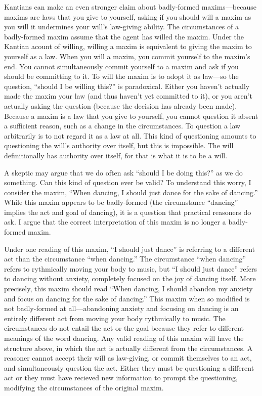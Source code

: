 \begin{isabellebody}
\begin{isamarkuptext}
Kantians can make an even stronger claim about badly-formed maxims—because maxims are laws that you 
give to yourself, asking if you should will a maxim as you will it undermines your will's law-giving 
ability. The circumstances of a badly-formed maxim assume that the agent has willed the maxim. Under 
the Kantian acount of willing, willing a maxim is equivalent to giving the maxim to yourself as a law. 
When you will a maxim, you commit yourself to the maxim's end. You cannot simultaneously 
commit yourself to a maxim and ask if you should be committing to it. To will the maxim is to adopt it as 
law—so the question, ``should I be willing this?'' is paradoxical. Either you haven't actually made 
the maxim your law (and thus haven't yet committed to it), or you aren't actually asking 
the question (because the decision has already been made). Because a maxim is a law that you give to 
yourself, you cannot question it absent a sufficient reason, such as a change in the circumstances. 
To question a law arbitrarily is to not regard it as a law at all. This kind of questioning amounts to 
questioning the will's authority over itself, but this is impossible. The will definitionally has authority 
over itself, for that is what it is to be a will. 

A skeptic may argue that we do often ask ``should I be doing this?'' as we do something. 
Can this kind of question ever be valid? To understand this worry, I consider the maxim, 
``When dancing, I should just dance for the sake of dancing.'' While this maxim appears to be badly-formed (the 
circumstance ``dancing'' implies the act and goal of dancing), it is a question that practical reasoners 
do ask. I argue that the correct interpretation of this maxim is no longer a badly-formed maxim.

Under one reading of this maxim, ``I should just dance'' is referring to a different act than the 
circumstance ``when dancing.'' The circumstance ``when dancing'' refers 
to rythmically moving your body to music, but ``I should just dance'' refers to dancing without anxiety, 
completely focused on the joy of dancing itself. More precisely, this maxim should read ``When 
dancing, I should abandon my anxiety and focus on dancing for the sake of dancing.'' This maxim when so 
modified is not badly-formed at all—abandoning anxiety and focusing on dancing is an entirely different act 
from moving your body rythmically to music. The circumstances do not entail the act or the goal because 
they refer to different meanings of the word dancing. Any valid reading of this maxim will have the structure above, 
in which the act is actually different from the circumstances. A reasoner cannot accept their will 
as law-giving, or commit themselves to an act, and simultaneously question the act. Either they must be 
questioning a different act or they must have recieved new information to prompt the questioning, 
modifying the circumstances of the original maxim. 


\end{isamarkuptext}
\end{isabellebody}

